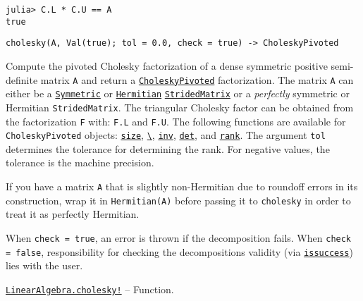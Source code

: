 \begin{adjustwidth}{2em}{0pt}
\begin{verbatim}
julia> C.L * C.U == A
true
\end{verbatim}




\begin{lstlisting}
cholesky(A, Val(true); tol = 0.0, check = true) -> CholeskyPivoted
\end{lstlisting}

Compute the pivoted Cholesky factorization of a dense symmetric positive semi-definite matrix \texttt{A} and return a \hyperlink{9530655262094960367}{\texttt{CholeskyPivoted}} factorization. The matrix \texttt{A} can either be a \hyperlink{17683454167504168761}{\texttt{Symmetric}} or \hyperlink{938713992181310063}{\texttt{Hermitian}} \hyperlink{3855703768476610836}{\texttt{StridedMatrix}} or a \emph{perfectly} symmetric or Hermitian \texttt{StridedMatrix}. The triangular Cholesky factor can be obtained from the factorization \texttt{F} with: \texttt{F.L} and \texttt{F.U}. The following functions are available for \texttt{CholeskyPivoted} objects: \hyperlink{17888996102305087038}{\texttt{size}}, \hyperlink{2092789550033334797}{\texttt{{\textbackslash}}}, \hyperlink{13336866048543706848}{\texttt{inv}}, \hyperlink{16543378577000914469}{\texttt{det}}, and \hyperlink{439390458422397873}{\texttt{rank}}. The argument \texttt{tol} determines the tolerance for determining the rank. For negative values, the tolerance is the machine precision.

If you have a matrix \texttt{A} that is slightly non-Hermitian due to roundoff errors in its construction, wrap it in \texttt{Hermitian(A)} before passing it to \texttt{cholesky} in order to treat it as perfectly Hermitian.

When \texttt{check = true}, an error is thrown if the decomposition fails. When \texttt{check = false}, responsibility for checking the decomposition{\textquotesingle}s validity (via \hyperlink{10694198281534172656}{\texttt{issuccess}}) lies with the user.



\end{adjustwidth}
\hypertarget{3967830962731048730}{}
\hyperlink{3967830962731048730}{\texttt{LinearAlgebra.cholesky!}}  -- {Function.}

